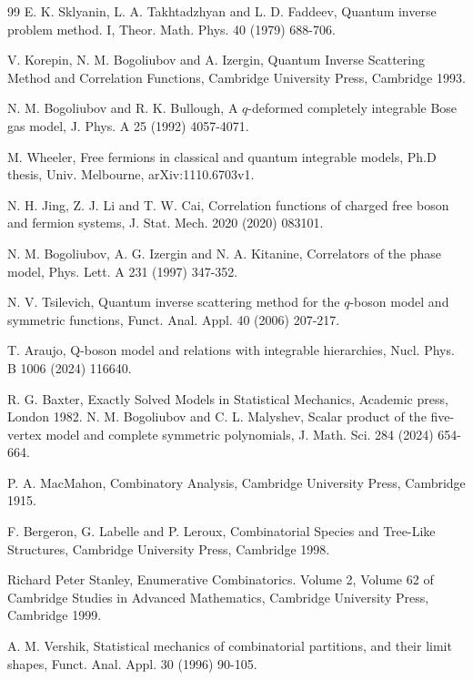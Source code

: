 \documentclass[11pt,reqno]{amsart}
\numberwithin{equation}{section}
\begin{document}
\begin{thebibliography}{99}
		E. K. Sklyanin, L. A. Takhtadzhyan and L. D. Faddeev, Quantum inverse problem method. I, Theor. Math. Phys. 40 (1979) 688-706.
		
		V. Korepin, N. M. Bogoliubov and A. Izergin, Quantum Inverse Scattering Method and Correlation Functions, Cambridge University Press,  Cambridge 1993.
		
		N. M. Bogoliubov and R. K. Bullough, A $q$-deformed completely integrable Bose gas model, J. Phys. A 25 (1992) 4057-4071.
		
		M. Wheeler, Free fermions in classical and quantum integrable models, Ph.D thesis, Univ. Melbourne, arXiv:1110.6703v1.
		
		N. H. Jing, Z. J. Li and T. W.  Cai, Correlation functions of charged free boson and fermion systems, J. Stat. Mech. 2020 (2020) 083101.
		
		N. M. Bogoliubov, A. G. Izergin and N. A. Kitanine, Correlators of the phase model, Phys. Lett. A 231 (1997) 347-352.
		
		N. V. Tsilevich, Quantum inverse scattering method for the $q$-boson model and symmetric functions, Funct. Anal. Appl. 40 (2006) 207-217.
		
		T. Araujo, Q-boson model and relations with integrable hierarchies, Nucl. Phys. B 1006 (2024) 116640.
		
	 	R. G. Baxter, Exactly Solved Models in Statistical Mechanics,  Academic press, London 1982.	
		 N. M. Bogoliubov and C. L. Malyshev, Scalar product of the five-vertex model and complete symmetric polynomials, J. Math. Sci. 284 (2024) 654-664.
		
		P. A. MacMahon, Combinatory Analysis,  Cambridge University Press, Cambridge  1915.
		
		 F. Bergeron, G. Labelle and P. Leroux, Combinatorial Species and Tree-Like Structures, Cambridge University Press, Cambridge 1998.
		
		 Richard Peter Stanley, Enumerative Combinatorics. Volume 2, Volume 62 of Cambridge Studies in Advanced Mathematics,  Cambridge University Press, Cambridge 1999.	
		
		A. M. Vershik, Statistical mechanics of combinatorial partitions, and their limit shapes, Funct. Anal. Appl. 30 (1996) 90-105.
		

\end{thebibliography}
\end{document}
